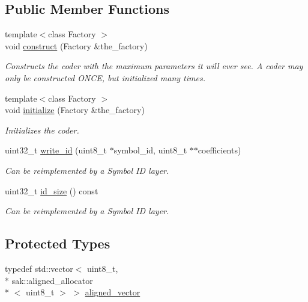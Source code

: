 \subsection*{Public Member Functions}
\begin{DoxyCompactItemize}
\item 
{\footnotesize template$<$class Factory $>$ }\\void \hyperlink{classkodo_1_1recoding__symbol__id_a088c75c4c9e038e794f63a61a7e5c146}{construct} (Factory \&the\-\_\-factory)
\begin{DoxyCompactList}\small\item\em Constructs the coder with the maximum parameters it will ever see. A coder may only be constructed O\-N\-C\-E, but initialized many times. \end{DoxyCompactList}\item 
{\footnotesize template$<$class Factory $>$ }\\void \hyperlink{classkodo_1_1recoding__symbol__id_ab4df46e26add996f7fe00ca22de0c3a8}{initialize} (Factory \&the\-\_\-factory)
\begin{DoxyCompactList}\small\item\em Initializes the coder. \end{DoxyCompactList}\item 
uint32\-\_\-t \hyperlink{classkodo_1_1recoding__symbol__id_a70379a2f8a0aa4be185f1ba7285bae4a}{write\-\_\-id} (uint8\-\_\-t $\ast$symbol\-\_\-id, uint8\-\_\-t $\ast$$\ast$coefficients)
\begin{DoxyCompactList}\small\item\em Can be reimplemented by a Symbol I\-D layer. \end{DoxyCompactList}\item 
uint32\-\_\-t \hyperlink{classkodo_1_1recoding__symbol__id_acee3dcbfc14d3db71cfb22677e461521}{id\-\_\-size} () const 
\begin{DoxyCompactList}\small\item\em Can be reimplemented by a Symbol I\-D layer. \end{DoxyCompactList}\end{DoxyCompactItemize}
\subsection*{Protected Types}
\begin{DoxyCompactItemize}
\item 
typedef std\-::vector$<$ uint8\-\_\-t, \\*
sak\-::aligned\-\_\-allocator\\*
$<$ uint8\-\_\-t $>$ $>$ \hyperlink{classkodo_1_1recoding__symbol__id_a12f113fed76cfaf960e79504c4c2f93c}{aligned\-\_\-vector}
\end{DoxyCompactItemize}
